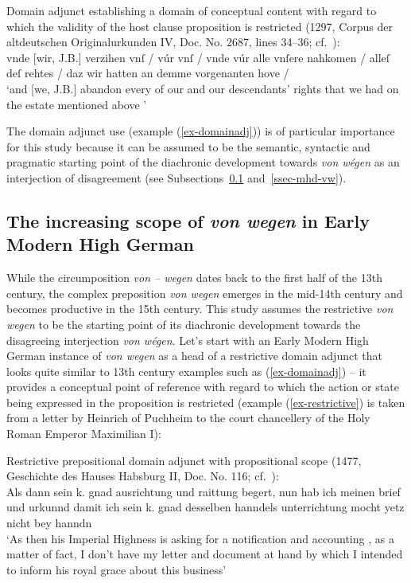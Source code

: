 \documentclass[output=paper
  ,nobabel
  ,draftmode
  ,babelshorthands
  ,colorlinks, citecolor=brown
]{langscibook}
\begin{document}
\ea\label{ex-domainadj} 
Domain adjunct establishing a domain of conceptual content with regard to which the validity of the host clause proposition is restricted (1297, Corpus der altdeutschen Originalurkunden IV, Doc. No. 2687, lines 34--36; cf.\ \citealp[78]{deBoorHaacke1963}):\\
\smallskip
	vnde [wir, J.B.] verzihen vnſ / vúr vnſ / vnde vúr alle vnſere nahkomen / alleſ deſ rehtes / daz wir hatten an demme vorgenanten hove / \\
`and [we, J.B.] abandon every of our and our descendants' rights that we had on the estate mentioned above '
\z

\noindent
The domain adjunct use (example (\ref{ex-domainadj})) is of particular importance for this study because it can be assumed to be the semantic, syntactic and pragmatic starting point of the diachronic development towards \emph{von wégen} as an interjection of disagreement (see Subsections~\ref{ssec-frnhd-scope-vw} and~\ref{ssec-mhd-vw}). 

\subsection{The increasing scope of \emph{von wegen} in Early Modern High German}\label{ssec-frnhd-scope-vw}

While the circumposition \emph{von – wegen} dates back to the first half of the 13th century, the
complex preposition \emph{von wegen} emerges in the mid-14th century and becomes productive in the
15th century. This study assumes the restrictive \emph{von wegen} to be the starting point of its
diachronic development towards the disagreeing interjection \emph{von wégen}. Let’s start with an
Early Modern High German instance of \emph{von wegen} as a head of a restrictive domain adjunct that looks quite similar to 13th century examples such as (\ref{ex-domainadj}) -- it provides a conceptual point of reference with regard to which the action or state being expressed in the proposition is restricted (example (\ref{ex-restrictive}) is taken from a letter by Heinrich of Puchheim to the court chancellery of the Holy Roman Emperor Maximilian I):

\ea\label{ex-restrictive} Restrictive prepositional domain adjunct with propositional scope (1477, Geschichte des Hauses Habsburg II, Doc. No. 116; cf.\ \citealp[304]{Chmel1855}):\\
Als dann sein k. gnad  ausrichtung und raittung begert, nun hab ich meinen brief und urkunnd damit ich sein k. gnad desselben hanndels unterrichtung mocht yetz nicht bey hanndn \\
	`As then his Imperial Highness is asking for a notification and accounting , as a matter of fact, I don’t have my letter and document at hand by which I intended to inform his royal grace about this business'
\z
\end{document}
